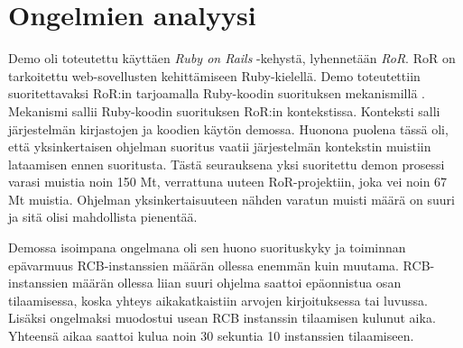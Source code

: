 \section{Ongelmien analyysi}
Demo oli toteutettu käyttäen \emph{Ruby on Rails} -kehystä, lyhennetään \emph{RoR}. RoR on tarkoitettu web-sovellusten kehittämiseen Ruby-kielellä. Demo toteutettiin suoritettavaksi RoR:in tarjoamalla Ruby-koodin suorituksen mekanismillä \cite{rails-runner}. Mekanismi sallii Ruby-koodin suorituksen RoR:in kontekstissa. Konteksti salli järjestelmän kirjastojen ja koodien käytön demossa. Huonona puolena tässä oli, että yksinkertaisen ohjelman suoritus vaatii järjestelmän kontekstin muistiin lataamisen ennen suoritusta. Tästä seurauksena yksi suoritettu demon prosessi varasi muistia noin 150 Mt, verrattuna uuteen RoR-projektiin, joka vei noin 67 Mt muistia. Ohjelman yksinkertaisuuteen nähden varatun muisti määrä on suuri ja sitä olisi mahdollista pienentää.

Demossa isoimpana ongelmana oli sen huono suorituskyky ja toiminnan epävarmuus RCB-instanssien määrän ollessa enemmän kuin muutama. RCB-instanssien määrän ollessa liian suuri ohjelma saattoi epäonnistua osan tilaamisessa, koska yhteys aikakatkaistiin arvojen kirjoituksessa tai luvussa. Lisäksi ongelmaksi muodostui usean RCB instanssin tilaamisen kulunut aika. Yhteensä aikaa saattoi kulua noin 30 sekuntia 10 instanssien tilaamiseen.

